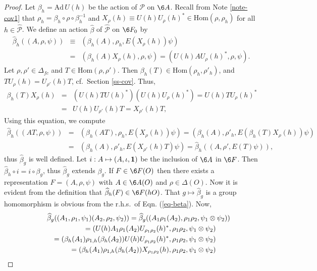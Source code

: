 \documentclass[11pt]{article}
\theoremstyle{definition}
\theoremstyle{definition}
\theoremstyle{remark}
\def\2#1{{\mathcal #1}}
\def\1#1{{\bf #1}}
\newcommand{\Hom}{\mathrm{Hom}}
\begin{document}
\begin{proof} Let $\beta_h=\mathrm{Ad}\,U(h)$ be the action of $\2P$ on $\6A$.
Recall from Note \ref{note-cov1} that $\rho_h=\beta_h\circ\rho\circ\beta_h^{-1}$ and 
$X_\rho(h)\equiv U(h)U_\rho(h)^*\in\Hom(\rho,\rho_h)$ for all $h\in\widehat{\2P}$.
We define an action $\widehat{\beta}$ of $\widehat{\2P}$ on $\6F_0$ by  
\begin{eqnarray} \widehat{\beta}_h((A,\rho,\psi)) &\equiv& (\beta_h(A),\rho_h,E(X_\rho(h))\psi) \nonumber\\
   &=& (\beta_h(A)X_\rho(h),\rho,\psi) =(U(h)AU_\rho(h)^*,\rho,\psi). \label{eq-beta}
\end{eqnarray}
Let $\rho,\rho'\in\Delta_{fc}$ and $T\in\Hom(\rho,\rho')$. Then $\beta_h(T)\in\Hom(\rho_h,\rho'_h)$,
and $TU_\rho(h)=U_{\rho'}(h)T$, cf.\ Section \ref{ss-cov}. Thus,
\begin{eqnarray*} \beta_h(T)X_\rho(h) &=& (U(h)TU(h)^*)(U(h)U_\rho(h)^*)=U(h)TU_\rho(h)^* \\
   &=& U(h)U_{\rho'}(h)T=X_{\rho'}(h)T, \end{eqnarray*}
Using this equation, we compute
\begin{eqnarray*} \widehat{\beta}_h((AT,\rho,\psi)) &=& (\beta_h(AT),\rho_h,E(X_\rho(h))\psi) 
   =  (\beta_h(A),\rho'_h,E(\beta_h(T)X_\rho(h))\psi)  \\
   &=&  (\beta_h(A),\rho'_h,E(X_{\rho'}(h)T)\psi) =  \widehat{\beta}_h((A,\rho',E(T)\psi)),
\end{eqnarray*}
thus $\widehat{\beta}_g$ is well defined. Let $i:A\mapsto(A,\iota,\11)$ be the inclusion of $\6A$ in
$\6F$. Then $\widehat{\beta}_h\circ i=i\circ\beta_g$, thus $\widehat{\beta}_g$ extends $\beta_g$.
If $F\in\6F(O)$ then there exists a representation
$F=(A,\rho,\psi)$ with $A\in\6A(O)$ and $\rho\in\Delta(O)$. Now it is evident from the definition
that $\widehat{\beta}_h(F)\in\6F(hO)$. That $g\mapsto\widehat{\beta}_g$ is a group homomorphism
is obvious from the r.h.s.\ of Eqn. (\ref{eq-beta}). Now,
\begin{eqnarray*} \lefteqn{ \widehat{\beta}_g((A_1,\rho_1,\psi_1)(A_2,\rho_2,\psi_2)) =
   \widehat{\beta}_g((A_1\rho_1(A_2),\rho_1\rho_2,\psi_1\otimes\psi_2)) } \\
  &&= (U(h)A_1\rho_1(A_2)U_{\rho_1\rho_2}(h)^*,\rho_1\rho_2,\psi_1\otimes\psi_2)  \\
  &&= (\beta_h(A_1)\rho_{1,h}(\beta_h(A_2))U(h)U_{\rho_1\rho_2}(h)^*,\rho_1\rho_2,\psi_1\otimes\psi_2) \\
  &&= (\beta_h(A_1)\rho_{1,h}(\beta_h(A_2))X_{\rho_1\rho_2}(h),\rho_1\rho_2,\psi_1\otimes\psi_2) \\

\end{eqnarray*}
\end{proof}
\end{document}
